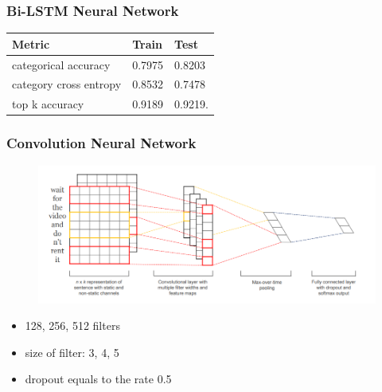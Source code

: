 \documentclass[14pt]{beamer}
\begin{document}
		
		\begin{frame}
			\frametitle{Bi-LSTM Neural Network}
			\begin{table}[h]
				\centering
				\begin{tabular}{| p{4cm} | p{3cm} | p{3cm} |}
					\hline
					\textbf{Metric}  & \textbf{Train} & \textbf{Test}                                                    
					\\ \hline
					categorical accuracy   &  0.7975 & 0.8203
					\\ \hline
					category cross entropy  &  0.8532 & 0.7478
					\\ \hline
					top k accuracy   &  0.9189 & 0.9219.
					\\ \hline		
				\end{tabular}
			\end{table}	
		\end{frame}
		
		
		\begin{frame}
			\frametitle{Convolution Neural Network }
			\begin{figure}[ht] 
				\center
				\includegraphics [scale=0.3] {CNN}
			\end{figure}
			\begin{itemize}
				\item 128, 256, 512 filters
				\item size of filter: 3, 4, 5
				\item dropout equals to the rate 0.5
			\end{itemize}	
		\end{frame}
		
\end{document}
